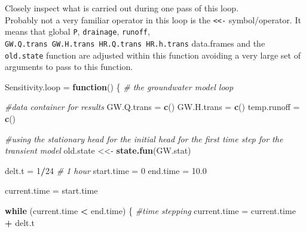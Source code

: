 \documentclass[
]{article}
\newenvironment{Shaded}{\begin{snugshade}}{\end{snugshade}}
\newcommand{\CommentTok}[1]{\textcolor[rgb]{0.56,0.35,0.01}{\textit{#1}}}
\newcommand{\ControlFlowTok}[1]{\textcolor[rgb]{0.13,0.29,0.53}{\textbf{#1}}}
\newcommand{\DecValTok}[1]{\textcolor[rgb]{0.00,0.00,0.81}{#1}}
\newcommand{\FloatTok}[1]{\textcolor[rgb]{0.00,0.00,0.81}{#1}}
\newcommand{\FunctionTok}[1]{\textcolor[rgb]{0.13,0.29,0.53}{\textbf{#1}}}
\newcommand{\NormalTok}[1]{#1}
\newcommand{\OtherTok}[1]{\textcolor[rgb]{0.56,0.35,0.01}{#1}}
\newcommand{\SpecialCharTok}[1]{\textcolor[rgb]{0.81,0.36,0.00}{\textbf{#1}}}
\begin{document}
Closely inspect what is carried out during one pass of this loop.\\
Probably not a very familiar operator in this loop is the
\texttt{\textless{}\textless{}-} symbol/operator. It means that global
\texttt{P}, \texttt{drainage}, \texttt{runoff},
\texttt{GW.Q.trans\ GW.H.trans\ HR.Q.trans\ HR.h.trans} data.frames and
the \texttt{old.state} function are adjusted within this function
avoiding a very large set of arguments to pass to this function.

\begin{Shaded}
\begin{Highlighting}[]
\NormalTok{Sensitivity.loop }\OtherTok{=} \ControlFlowTok{function}\NormalTok{()}
\NormalTok{\{}
  \CommentTok{\# the groundwater model loop}
  
  \CommentTok{\#data container for results}
\NormalTok{  GW.Q.trans }\OtherTok{=} \FunctionTok{c}\NormalTok{()}
\NormalTok{  GW.H.trans }\OtherTok{=} \FunctionTok{c}\NormalTok{()}
\NormalTok{  temp.runoff }\OtherTok{=} \FunctionTok{c}\NormalTok{()}
  

  \CommentTok{\#using the stationary head for the initial head for the first time step for the transient model}
\NormalTok{  old.state }\OtherTok{\textless{}\textless{}{-}} \FunctionTok{state.fun}\NormalTok{(GW.stat)}
  
\NormalTok{  delt.t }\OtherTok{=} \DecValTok{1}\SpecialCharTok{/}\DecValTok{24} \CommentTok{\# 1 hour}
\NormalTok{  start.time }\OtherTok{=} \DecValTok{0}
\NormalTok{  end.time }\OtherTok{=}  \FloatTok{10.0}
  
\NormalTok{  current.time }\OtherTok{=}\NormalTok{ start.time}
  
  \ControlFlowTok{while}\NormalTok{ (current.time }\SpecialCharTok{\textless{}}\NormalTok{ end.time)}
\NormalTok{  \{}
    \CommentTok{\#time stepping}
\NormalTok{    current.time }\OtherTok{=}\NormalTok{ current.time }\SpecialCharTok{+}\NormalTok{ delt.t}
    

\end{Highlighting}
\end{Shaded}
\end{document}
